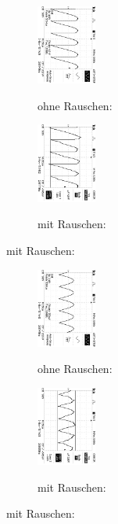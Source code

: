\begin{figure}
\caption{$U_{out} (\phi = 45°$) }
\begin{subfigure}{0.48\textwidth}
\centering
\caption{ohne Rauschen:}
\includegraphics[angle=90,height=2.6cm]{graphics/ALL0037/F0037TEK.jpg}
\label{fig:phi45o}
\end{subfigure}
\begin{subfigure}{0.48\textwidth}
\centering
\caption{mit Rauschen:}
\includegraphics[angle=90,height=2.6cm]{graphics/ALL0045/F0045TEK.jpg}
\label{fig:phi45m}
\end{subfigure}
\end{figure}

\begin{figure}
\caption{$U_{out} (\phi = 340°$) }
\begin{subfigure}{0.48\textwidth}
\centering
\caption{ohne Rauschen:}
\includegraphics[angle=90,height=2.6cm]{graphics/ALL0038/F0038TEK.jpg}
\label{fig:phi340o}
\end{subfigure}
\begin{subfigure}{0.48\textwidth}
\centering
\caption{mit Rauschen:}
\includegraphics[angle=90,height=2.6cm]{graphics/ALL0046/F0046TEK.jpg}
\label{fig:phi340m}
\end{subfigure}

\label{fig:U_out}
\end{figure}


